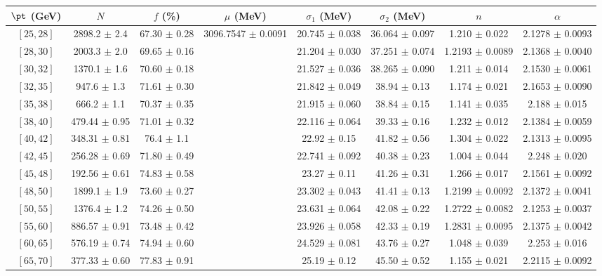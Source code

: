 \begin{tabular}{c||c|c|c|c|c|c|c}
$\pt$ (GeV) & $N$ & $f$ (\%) & $\mu$ (MeV) & $\sigma_1$ (MeV) & $\sigma_2$ (MeV) & $n$ & $\alpha$ \\
\hline
$[25, 28]$ & 2898.2 $\pm$ 2.4 & 67.30 $\pm$ 0.28 & \multirow{19}{*}{3096.7547 $\pm$ 0.0091} & 20.745 $\pm$ 0.038 & 36.064 $\pm$ 0.097 & 1.210 $\pm$ 0.022 & 2.1278 $\pm$ 0.0093\\
$[28, 30]$ & 2003.3 $\pm$ 2.0 & 69.65 $\pm$ 0.16 &  & 21.204 $\pm$ 0.030 & 37.251 $\pm$ 0.074 & 1.2193 $\pm$ 0.0089 & 2.1368 $\pm$ 0.0040\\
$[30, 32]$ & 1370.1 $\pm$ 1.6 & 70.60 $\pm$ 0.18 &  & 21.527 $\pm$ 0.036 & 38.265 $\pm$ 0.090 & 1.211 $\pm$ 0.014 & 2.1530 $\pm$ 0.0061\\
$[32, 35]$ & 947.6 $\pm$ 1.3 & 71.61 $\pm$ 0.30 &  & 21.842 $\pm$ 0.049 & 38.94 $\pm$ 0.13 & 1.174 $\pm$ 0.021 & 2.1653 $\pm$ 0.0090\\
$[35, 38]$ & 666.2 $\pm$ 1.1 & 70.37 $\pm$ 0.35 &  & 21.915 $\pm$ 0.060 & 38.84 $\pm$ 0.15 & 1.141 $\pm$ 0.035 & 2.188 $\pm$ 0.015\\
$[38, 40]$ & 479.44 $\pm$ 0.95 & 71.01 $\pm$ 0.32 &  & 22.116 $\pm$ 0.064 & 39.33 $\pm$ 0.16 & 1.232 $\pm$ 0.012 & 2.1384 $\pm$ 0.0059\\
$[40, 42]$ & 348.31 $\pm$ 0.81 & 76.4 $\pm$ 1.1 &  & 22.92 $\pm$ 0.15 & 41.82 $\pm$ 0.56 & 1.304 $\pm$ 0.022 & 2.1313 $\pm$ 0.0095\\
$[42, 45]$ & 256.28 $\pm$ 0.69 & 71.80 $\pm$ 0.49 &  & 22.741 $\pm$ 0.092 & 40.38 $\pm$ 0.23 & 1.004 $\pm$ 0.044 & 2.248 $\pm$ 0.020\\
$[45, 48]$ & 192.56 $\pm$ 0.61 & 74.83 $\pm$ 0.58 &  & 23.27 $\pm$ 0.11 & 41.26 $\pm$ 0.31 & 1.266 $\pm$ 0.017 & 2.1561 $\pm$ 0.0092\\
$[48, 50]$ & 1899.1 $\pm$ 1.9 & 73.60 $\pm$ 0.27 &  & 23.302 $\pm$ 0.043 & 41.41 $\pm$ 0.13 & 1.2199 $\pm$ 0.0092 & 2.1372 $\pm$ 0.0041\\
$[50, 55]$ & 1376.4 $\pm$ 1.2 & 74.26 $\pm$ 0.50 &  & 23.631 $\pm$ 0.064 & 42.08 $\pm$ 0.22 & 1.2722 $\pm$ 0.0082 & 2.1253 $\pm$ 0.0037\\
$[55, 60]$ & 886.57 $\pm$ 0.91 & 73.48 $\pm$ 0.42 &  & 23.926 $\pm$ 0.058 & 42.33 $\pm$ 0.19 & 1.2831 $\pm$ 0.0095 & 2.1375 $\pm$ 0.0042\\
$[60, 65]$ & 576.19 $\pm$ 0.74 & 74.94 $\pm$ 0.60 &  & 24.529 $\pm$ 0.081 & 43.76 $\pm$ 0.27 & 1.048 $\pm$ 0.039 & 2.253 $\pm$ 0.016\\
$[65, 70]$ & 377.33 $\pm$ 0.60 & 77.83 $\pm$ 0.91 &  & 25.19 $\pm$ 0.12 & 45.50 $\pm$ 0.52 & 1.155 $\pm$ 0.021 & 2.2115 $\pm$ 0.0092\\

\end{tabular}
